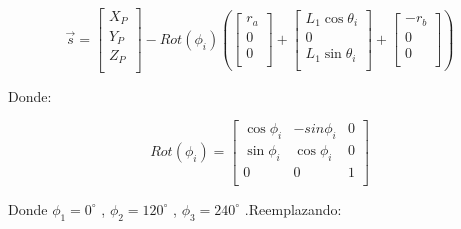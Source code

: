                  \[ \overrightarrow{s}= \left[ \begin{matrix}
                X_{P}\\
                Y_{P}\\
                Z_{P}\\
                \end{matrix}
                 \right] -Rot \left(  \phi _{i} \right)  \left(  \left[ \begin{matrix}
                r_{a}\\
                0\\
                0\\
                \end{matrix}
                 \right] + \left[ \begin{matrix}
                L_{1}\cos  \theta _{i}\\
                0\\
                L_{1}\sin  \theta _{i}\\
                \end{matrix}
                 \right] + \left[ \begin{matrix}
                -r_{b}\\
                0\\
                0\\
                \end{matrix}
                 \right]  \right)  \] 
                
                Donde:
                
                 \[ Rot \left(  \phi _{i} \right) = \left[ \begin{matrix}
                \cos  \phi _{i}  &  -sin \phi _{i}  &  0\\
                \sin  \phi _{i}  &  \cos  \phi _{i}  &  0\\
                0  &  0  &  1\\
                \end{matrix}
                 \right]  \] 
                
                Donde  \(  \phi _{1}=0 ^{\circ}  \)  ,  \(  \phi _{2}=120 ^{\circ}  \)  ,  \(  \phi _{3}=240 ^{\circ}  \)  .Reemplazando:
                
